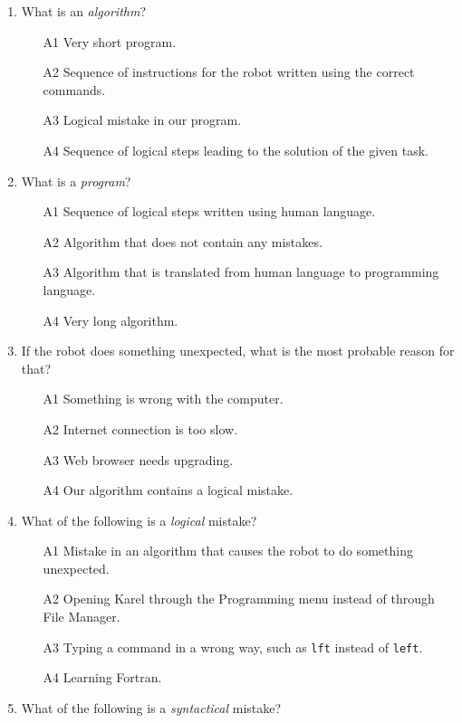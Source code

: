\documentclass[article,A4,12pt]{llncs}
\begin{document}
\begin{enumerate}
\item What is an {\em algorithm}?
\begin{enumerate}
\item[A1] Very short program.
\item[A2] Sequence of instructions for the robot written using the correct commands.
\item[A3] Logical mistake in our program.
\item[A4] Sequence of logical steps leading to the solution of the given task.
\end{enumerate}
\item What is a {\em program}?
\begin{enumerate}
\item[A1] Sequence of logical steps written using human language.
\item[A2] Algorithm that does not contain any mistakes.
\item[A3] Algorithm that is translated from human language to programming language.
\item[A4] Very long algorithm.
\end{enumerate}
\item If the robot does something unexpected, what is the most probable reason for that?
\begin{enumerate}
\item[A1] Something is wrong with the computer.
\item[A2] Internet connection is too slow.
\item[A3] Web browser needs upgrading.
\item[A4] Our algorithm contains a logical mistake.
\end{enumerate}
\item What of the following is a {\em logical} mistake?
\begin{enumerate}
\item[A1] Mistake in an algorithm that causes the robot to do something unexpected.
\item[A2] Opening Karel through the Programming menu instead of through File Manager. 
\item[A3] Typing a command in a wrong way, such as {\tt lft} instead of {\tt left}.
\item[A4] Learning Fortran.
\end{enumerate}
\item What of the following is a {\em syntactical} mistake?
\begin{enumerate}

\end{enumerate}
\end{enumerate}
\end{document}
